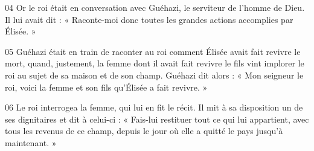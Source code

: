
04 Or le roi était en conversation avec Guéhazi, le serviteur de l’homme de Dieu. Il lui avait dit : « Raconte-moi donc toutes les grandes actions accomplies par Élisée. »

05 Guéhazi était en train de raconter au roi comment Élisée avait fait revivre le mort, quand, justement, la femme dont il avait fait revivre le fils vint implorer le roi au sujet de sa maison et de son champ. Guéhazi dit alors : « Mon seigneur le roi, voici la femme et son fils qu’Élisée a fait revivre. »

06 Le roi interrogea la femme, qui lui en fit le récit. Il mit à sa disposition un de ses dignitaires et dit à celui-ci : « Fais-lui restituer tout ce qui lui appartient, avec tous les revenus de ce champ, depuis le jour où elle a quitté le pays jusqu’à maintenant. »
